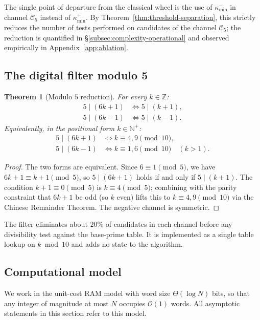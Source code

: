 \documentclass[11pt]{amsart}
\numberwithin{equation}{section}
\newcommand{\ZZ}{\mathbb{Z}}
\newcommand{\NN}{\mathbb{N}}
\newcommand{\kminp}{\kappa_{\min}^{+}}
\newcommand{\kminm}{\kappa_{\min}^{-}}
\newcommand{\Cfive}{\mathcal{C}_5}
\theoremstyle{plain}
\newtheorem{theorem}{Theorem}[section]
\theoremstyle{definition}
\begin{document}
The single point of departure from the classical wheel is the use of
$\kminm$ in channel $\Cfive$ instead of $\kminp$. By
Theorem~\ref{thm:threshold-separation}, this strictly reduces the
number of tests performed on candidates of the channel $\Cfive$;
the reduction is quantified in \S\ref{subsec:complexity-operational}
and observed empirically in Appendix~\ref{app:ablation}.

\subsection{The digital filter modulo 5}
\label{subsec:filter5}

\begin{theorem}[Modulo $5$ reduction]
\label{thm:filter5}
For every $k\in\ZZ$:
\begin{align}
5\mid(6k+1)&\iff 5\mid(k+1),\label{eq:filter-c1}\\
5\mid(6k-1)&\iff 5\mid(k-1).\label{eq:filter-c5}
\end{align}
Equivalently, in the positional form $k\in\NN^+$:
\begin{align}
5\mid(6k+1)&\iff k\equiv 4,9\pmod{10},\\
5\mid(6k-1)&\iff k\equiv 1,6\pmod{10}\quad(k>1).
\end{align}
\end{theorem}

\begin{proof}
The two forms are equivalent. Since $6\equiv 1\pmod 5$, we have
$6k+1\equiv k+1\pmod 5$, so $5\mid(6k+1)$ holds if and only if
$5\mid(k+1)$. The condition $k+1\equiv 0\pmod 5$ is $k\equiv 4\pmod 5$;
combining with the parity constraint that $6k+1$ be odd (so $k$ even)
lifts this to $k\equiv 4,9\pmod{10}$ via the Chinese Remainder Theorem.
The negative channel is symmetric.
\end{proof}

The filter eliminates about $20\%$ of candidates in each channel
before any divisibility test against the base-prime table. It is
implemented as a single table lookup on $k\bmod 10$ and adds no
state to the algorithm.

\subsection{Computational model}
\label{subsec:model}

We work in the unit-cost RAM model with word size $\Theta(\log N)$
bits, so that any integer of magnitude at most $N$ occupies
$\mathcal{O}(1)$ words. All asymptotic statements in this section refer
to this model.
\end{document}
